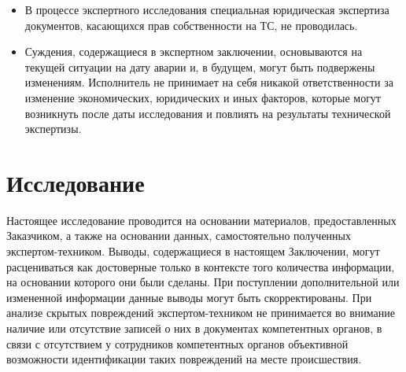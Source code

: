 \begin{itemize}
\item  {В процессе экспертного исследования специальная юридическая экспертиза документов, касающихся прав собственности на ТС, не проводилась.}
\item  {Суждения, содержащиеся в экспертном заключении, основываются на текущей ситуации на дату аварии и, в будущем, могут быть подвержены изменениям.
Исполнитель не принимает на себя никакой ответственности за изменение экономических, юридических и иных факторов, которые могут возникнуть после даты исследования и повлиять на результаты технической экспертизы.
}\end{itemize}
%
%
\section{Исследование}
%
Настоящее исследование проводится на основании материалов, предоставленных Заказчиком, а также на основании данных, самостоятельно полученных экспертом-техником. Выводы, содержащиеся в настоящем Заключении, могут расцениваться как достоверные только в контексте того количества информации, на основании которого они были сделаны. При поступлении дополнительной или измененной информации данные выводы могут быть
скорректированы. При анализе скрытых повреждений экспертом-техником не принимается во внимание наличие или отсутствие записей о них в документах компетентных органов, в связи с отсутствием у сотрудников компетентных органов объективной возможности  идентификации таких повреждений на месте происшествия.

